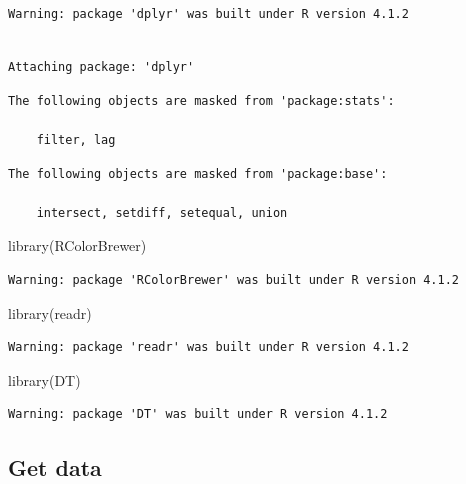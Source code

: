 \documentclass[
  12pt,
  letterpaper,
  DIV=11,
  numbers=noendperiod]{scrartcl}
\newenvironment{Shaded}{\begin{snugshade}}{\end{snugshade}}
\newcommand{\FunctionTok}[1]{\textcolor[rgb]{0.28,0.35,0.67}{#1}}
\newcommand{\NormalTok}[1]{\textcolor[rgb]{0.00,0.23,0.31}{#1}}
\begin{document}
\begin{verbatim}
Warning: package 'dplyr' was built under R version 4.1.2
\end{verbatim}

\begin{verbatim}

Attaching package: 'dplyr'
\end{verbatim}

\begin{verbatim}
The following objects are masked from 'package:stats':

    filter, lag
\end{verbatim}

\begin{verbatim}
The following objects are masked from 'package:base':

    intersect, setdiff, setequal, union
\end{verbatim}

\begin{Shaded}
\begin{Highlighting}[]
\FunctionTok{library}\NormalTok{(RColorBrewer)}
\end{Highlighting}
\end{Shaded}

\begin{verbatim}
Warning: package 'RColorBrewer' was built under R version 4.1.2
\end{verbatim}

\begin{Shaded}
\begin{Highlighting}[]
\FunctionTok{library}\NormalTok{(readr)}
\end{Highlighting}
\end{Shaded}

\begin{verbatim}
Warning: package 'readr' was built under R version 4.1.2
\end{verbatim}

\begin{Shaded}
\begin{Highlighting}[]
\FunctionTok{library}\NormalTok{(DT)}
\end{Highlighting}
\end{Shaded}

\begin{verbatim}
Warning: package 'DT' was built under R version 4.1.2
\end{verbatim}

\hypertarget{get-data}{%
\subsection{Get data}\label{get-data}}
\end{document}
